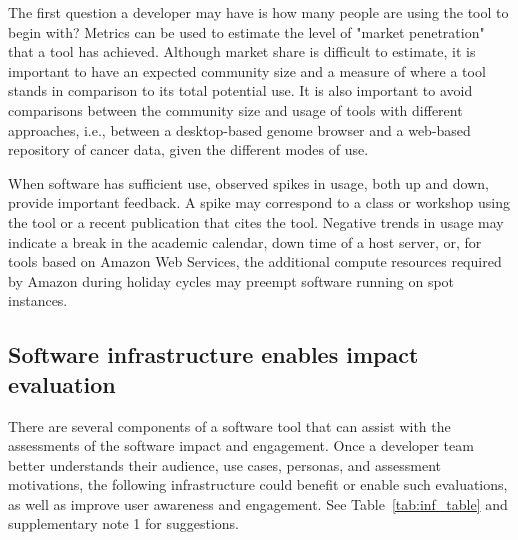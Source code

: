 \documentclass{article}
\begin{document}
The first question a developer may have is how many people are using the tool to begin with? Metrics can be used to estimate the level of "market penetration" that a tool has achieved. Although market share is difficult to estimate, it is important to have an expected community size and a measure of where a tool stands in comparison to its total potential use. It is also important to avoid comparisons between the community size and usage of tools with different approaches, i.e., between a desktop-based genome browser and a web-based repository of cancer data, given the different modes of use. 

When software has sufficient use, observed spikes in usage, both up and down, provide important feedback. A spike may correspond to a class or workshop using the tool or a recent publication that cites the tool. Negative trends in usage may indicate a break in the academic calendar, down time of a host server, or, for tools based on Amazon Web Services, the additional compute resources required by Amazon during holiday cycles may preempt software running on spot instances.


\subsection{Software infrastructure enables impact evaluation}
There are several components of a software tool that can assist with the assessments of the software impact and engagement. Once a developer team better understands their audience, use cases, personas, and assessment motivations, the following infrastructure could benefit or enable such evaluations, as well as improve user awareness and engagement. 
See Table~\ref{tab:inf_table} and supplementary note 1 for suggestions.
\end{document}
